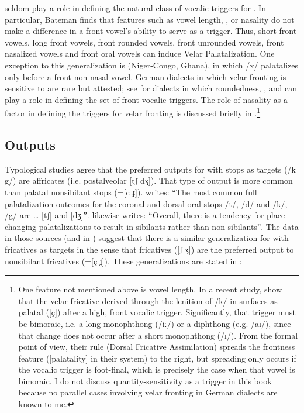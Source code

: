 \begin{xlist}
\begin{xlist}
 seldom play a role in defining the natural class of vocalic triggers for  \citep[62]{Bateman2007}. In particular, Bateman finds that features such as vowel length, , or nasality do not make a difference in a front vowel’s ability to serve as a trigger. Thus, short front vowels, long front vowels, front rounded vowels, front unrounded vowels, front nasalized vowels and front oral vowels can induce Velar Palatalization. One exception to this generalization \citep[54--55]{Bateman2007} is  (Niger-Congo, Ghana), in which /x/ palatalizes only before a front non-nasal vowel. German dialects in which velar fronting is sensitive to  are rare but attested; see  for dialects in which roundedness, , and  can play a role in defining the set of front vocalic triggers. The role of nasality as a factor in defining the triggers for velar fronting is discussed briefly in .\footnote{{One feature not mentioned above is vowel length. In a recent study, \citet{CardosoHoneybone2022} show that the velar fricative derived through the lenition of /k/ in  surfaces as palatal ([ç]) after a high, front vocalic trigger. Significantly, that trigger must be bimoraic, i.e. a long monophthong (/iː/) or a diphthong (e.g. /aɪ/), since that change does not occur after a short monophthong (/ɪ/). From the formal point of view, their rule (Dorsal Fricative Assimilation) spreads the frontness feature ([palatality] in their system) to the right, but spreading only occurs if the vocalic trigger is foot-final, which is precisely the case when that vowel is bimoraic. I do not discuss quantity-sensitivity as a trigger in this book because no parallel cases involving velar fronting in German dialects are known to me.}}

\subsection{Outputs }\label{sec:2.3.4}

Typological studies agree that the preferred outputs for  with stops as targets (/k g/) are  affricates (i.e. postalveolar [tʃ dʒ]). That type of output is more common than palatal nonsibilant stops (=[c ɟ]).  \citet[595]{Bateman2011} writes: “The most common full palatalization outcomes for the coronal and dorsal oral stops /t/, /d/ and /k/, /g/ are … [tʃ] and [dʒ]ˮ. \citet{Kochetov2011} likewise writes: “Overall, there is a tendency for place-changing palatalizations to result in sibilants rather than non-sibilantsˮ. The data in those sources (and in \citealt{Guion1998}) suggest that there is a similar generalization for  with fricatives as targets in the sense that  fricatives ([ʃ ʒ]) are the preferred output to nonsibilant fricatives (=[ç ʝ]). These generalizations are stated in :


\end{xlist}
\end{xlist}
